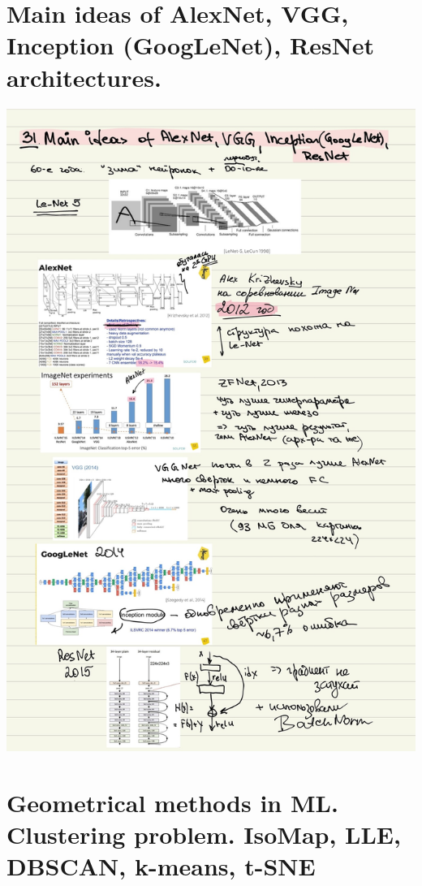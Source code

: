 \section{Main ideas of AlexNet, VGG, Inception (GoogLeNet), ResNet architectures.}
\includegraphics[width=400pt]{images/31.JPG}
\newpage

\section{Geometrical methods in ML. Clustering problem. IsoMap, LLE, DBSCAN, k-means, t-SNE}


